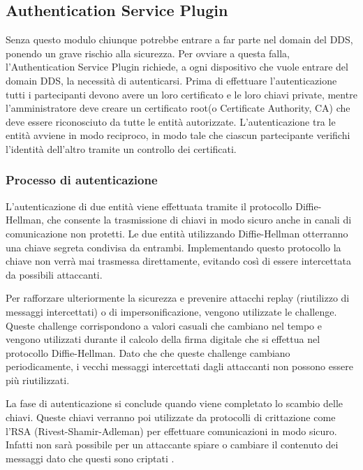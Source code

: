 \subsection{Authentication Service Plugin}
Senza questo modulo chiunque potrebbe entrare a far parte nel domain
del DDS, ponendo un grave rischio alla sicurezza. Per ovviare a questa
falla, l'Authentication Service Plugin richiede, a ogni dispositivo che 
vuole entrare del domain DDS, la necessità di autenticarsi.
Prima di effettuare l'autenticazione tutti i partecipanti devono 
avere un loro certificato e le loro chiavi private, mentre 
l'amministratore deve creare un certificato root(o Certificate Authority, CA) 
che deve essere riconosciuto da tutte le entità autorizzate. 
L'autenticazione tra le entità avviene in modo reciproco, 
in modo tale che ciascun partecipante verifichi l'identità dell'altro
tramite un controllo dei certificati.


\subsubsection{Processo di autenticazione}
L'autenticazione di due entità viene effettuata
tramite il protocollo Diffie-Hellman, che consente la trasmissione 
di chiavi in modo sicuro anche in canali di comunicazione non protetti.
Le due entità utilizzando Diffie-Hellman otterranno una chiave 
segreta condivisa da entrambi. Implementando questo 
protocollo la chiave non verrà mai 
trasmessa direttamente, evitando così di essere intercettata da 
possibili attaccanti. 

Per rafforzare ulteriormente la sicurezza e prevenire attacchi replay 
(riutilizzo di messaggi intercettati) o di impersonificazione, vengono 
utilizzate le challenge. Queste challenge corrispondono a valori 
casuali che cambiano nel tempo e vengono utilizzati durante il 
calcolo della firma digitale che si effettua nel protocollo
Diffie-Hellman.
Dato che che queste challenge cambiano periodicamente,
i vecchi messaggi intercettati dagli attaccanti non possono essere 
più riutilizzati.

La fase di autenticazione si conclude quando viene completato
lo scambio delle chiavi.
Queste chiavi verranno poi utilizzate da protocolli di 
crittazione come l'RSA (Rivest-Shamir-Adleman) per effettuare 
comunicazioni in modo sicuro. Infatti non sarà possibile per un 
attaccante spiare o cambiare il contenuto dei messaggi dato 
che questi sono criptati 
\cite{DBLP:conf/asiaccs/WangLG24}.
\label{Processo di autenticazione}

